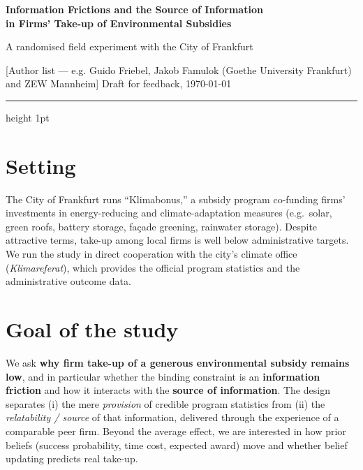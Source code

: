 \documentclass[10pt,a4paper]{article}
\begin{document}
{\sffamily\bfseries\LARGE\color{gublue}
Information Frictions and the Source of Information\\
in Firms' Take-up of Environmental Subsidies}

\vspace{2pt}
{\sffamily\color{gugrey}A randomised field experiment with the City of Frankfurt}

\vspace{4pt}
{\small\color{gugrey}%
[Author list — e.g. Guido Friebel, Jakob Famulok (Goethe University Frankfurt) and ZEW Mannheim] \quad\textbullet\quad Draft for feedback, \today}

\vspace{2pt}
{\color{gublue}\hrule height 1pt}
\vspace{4pt}

\section*{Setting}
The City of Frankfurt runs ``Klimabonus,'' a subsidy program co-funding
firms' investments in energy-reducing and climate-adaptation measures
(e.g.\ solar, green roofs, battery storage, fa\c{c}ade greening, rainwater
storage). Despite attractive terms, take-up among local firms is well
below administrative targets. We run the study in direct cooperation with
the city's climate office (\textit{Klimareferat}), which provides the
official program statistics and the administrative outcome data.

\section*{Goal of the study}
We ask \textbf{why firm take-up of a generous environmental subsidy
remains low}, and in particular whether the binding constraint is an
\textbf{information friction} and how it interacts with the \textbf{source
of information}. The design separates (i) the mere \emph{provision} of
credible program statistics from (ii) the \emph{relatability / source} of
that information, delivered through the experience of a comparable peer
firm. Beyond the average effect, we are interested in how prior beliefs
(success probability, time cost, expected award) move and whether belief
updating predicts real take-up.

\end{document}
